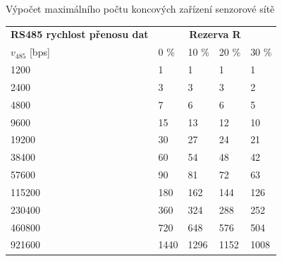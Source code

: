 \documentclass{beamer}
\begin{document}
\begin{frame} {Výpočet maximálního počtu koncových zařízení senzorové sítě}

	\begin{longtable} {|l|llll|}
			\hline
			\textbf{RS485 rychlost přenosu dat} &       \multicolumn{4}{c|}{\textbf{Rezerva R}}	  	    \\
			$v_{485}$ {[bps]}  &	0 \%	&	10 \%	&	20 \%	&	30 \%  \\ \hline
		
			1200~~~ &    1	&    1	&    1	&    1 \\
			2400~~~ &    3	&    3	&    3	&    2 \\
			4800~~~ &    7	&    6	&    6	&    5 \\
			9600~~~ &   15	&   13	&   12	&   10 \\
			19200~~~ &   30	&   27	&   24	&   21 \\
			38400~~~ &   60	&   54	&   48	&   42 \\
			57600~~~ &   90	&   81	&   72	&   63 \\
			115200~~~ &  180	&  162	&  144	&  126 \\
			230400~~~ &  360	&  324	&  288	&  252 \\
			460800~~~ &  720	&  648	&  576	&  504 \\
			921600~~~ & 1440	& 1296	& 1152	& 1008 \\
			\hline
		
		\end{longtable}
\end{frame}
\end{document}
